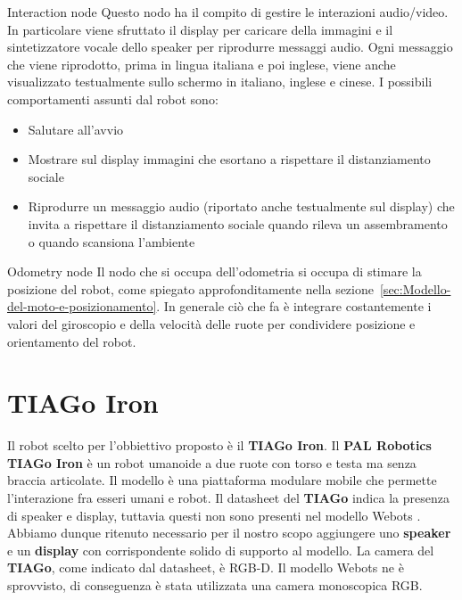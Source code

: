 \documentclass[10pt]{beamer}
\begin{document}
	\begin{frame}{Interaction node}
	Questo nodo ha il compito di gestire le interazioni audio/video. In
	particolare viene sfruttato il display per caricare della immagini e il
	sintetizzatore vocale dello speaker per riprodurre messaggi audio. Ogni
	messaggio che viene riprodotto, prima in lingua italiana e poi inglese,
	viene anche visualizzato testualmente sullo schermo in italiano, inglese e
	cinese.  I possibili comportamenti assunti dal robot sono:
	\begin{itemize}
		\item Salutare all'avvio
		\item Mostrare sul display immagini che esortano a rispettare il
			distanziamento sociale
		\item Riprodurre un messaggio audio (riportato anche testualmente sul
			display) che invita a rispettare il distanziamento sociale quando
			rileva un assembramento o quando scansiona l'ambiente
	\end{itemize}
	\end{frame}

	\begin{frame}{Odometry node}
	Il nodo che si occupa dell'odometria si occupa di stimare la posizione del
	robot, come spiegato approfonditamente nella
	sezione~\ref{sec:Modello-del-moto-e-posizionamento}. In generale ciò che fa
	è integrare costantemente i valori del giroscopio e della velocità delle
	ruote per condividere posizione e orientamento del robot.
	\end{frame}
	
	
	\section{TIAGo Iron}\label{sec:TIAGo-Iron} 
	\frame{\sectionpage}
	Il robot scelto per l'obbiettivo proposto è il \textbf{TIAGo Iron}.
	\newline Il \textbf{PAL Robotics TIAGo Iron} \cite{pages2016tiago} è un
	robot umanoide a due ruote con torso e testa ma senza braccia articolate.
	Il modello è una piattaforma modulare mobile che permette l'interazione fra
	esseri umani e robot. \newline Il datasheet del \textbf{TIAGo}
	\cite{tiago_datasheet} indica la presenza di speaker e display, tuttavia
	questi non sono presenti nel modello Webots \cite{tiagoiron}. Abbiamo
	dunque ritenuto necessario per il nostro scopo aggiungere uno
	\textbf{speaker} e un \textbf{display} con corrispondente solido di
	supporto al modello.
	La camera del \textbf{TIAGo}, come indicato dal datasheet, è RGB-D. Il
	modello Webots ne è sprovvisto, di conseguenza è stata utilizzata una
	camera monoscopica RGB.
\end{document}
